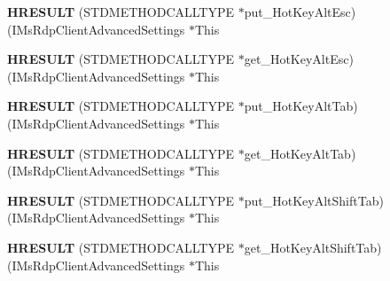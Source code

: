 \begin{DoxyCompactItemize}
\mbox{\label{struct_i_ms_rdp_client_advanced_settings_vtbl_a5c817702ddb5dfebacd35770310aa3d9}} 
{\bfseries H\+R\+E\+S\+U\+LT} (S\+T\+D\+M\+E\+T\+H\+O\+D\+C\+A\+L\+L\+T\+Y\+PE $\ast$put\+\_\+\+Hot\+Key\+Alt\+Esc)(I\+Ms\+Rdp\+Client\+Advanced\+Settings $\ast$This
\item 
\mbox{\label{struct_i_ms_rdp_client_advanced_settings_vtbl_af0b3e5be6158b9b51d9eb143f74f6f72}} 
{\bfseries H\+R\+E\+S\+U\+LT} (S\+T\+D\+M\+E\+T\+H\+O\+D\+C\+A\+L\+L\+T\+Y\+PE $\ast$get\+\_\+\+Hot\+Key\+Alt\+Esc)(I\+Ms\+Rdp\+Client\+Advanced\+Settings $\ast$This
\item 
\mbox{\label{struct_i_ms_rdp_client_advanced_settings_vtbl_a2706046b46534eb54d2806a72e4c41ac}} 
{\bfseries H\+R\+E\+S\+U\+LT} (S\+T\+D\+M\+E\+T\+H\+O\+D\+C\+A\+L\+L\+T\+Y\+PE $\ast$put\+\_\+\+Hot\+Key\+Alt\+Tab)(I\+Ms\+Rdp\+Client\+Advanced\+Settings $\ast$This
\item 
\mbox{\label{struct_i_ms_rdp_client_advanced_settings_vtbl_a32381ae37a025bbe8ef5721672a662ea}} 
{\bfseries H\+R\+E\+S\+U\+LT} (S\+T\+D\+M\+E\+T\+H\+O\+D\+C\+A\+L\+L\+T\+Y\+PE $\ast$get\+\_\+\+Hot\+Key\+Alt\+Tab)(I\+Ms\+Rdp\+Client\+Advanced\+Settings $\ast$This
\item 
\mbox{\label{struct_i_ms_rdp_client_advanced_settings_vtbl_a81fd0c28f1cc4364cc685f11163f8bfe}} 
{\bfseries H\+R\+E\+S\+U\+LT} (S\+T\+D\+M\+E\+T\+H\+O\+D\+C\+A\+L\+L\+T\+Y\+PE $\ast$put\+\_\+\+Hot\+Key\+Alt\+Shift\+Tab)(I\+Ms\+Rdp\+Client\+Advanced\+Settings $\ast$This
\item 
\mbox{\label{struct_i_ms_rdp_client_advanced_settings_vtbl_ac1dff4a88caebffc242d3d24009db1c9}} 
{\bfseries H\+R\+E\+S\+U\+LT} (S\+T\+D\+M\+E\+T\+H\+O\+D\+C\+A\+L\+L\+T\+Y\+PE $\ast$get\+\_\+\+Hot\+Key\+Alt\+Shift\+Tab)(I\+Ms\+Rdp\+Client\+Advanced\+Settings $\ast$This
\item 
\mbox{\label{struct_i_ms_rdp_client_advanced_settings_vtbl_a0849c4c50575b7b7b79145828de9e97b}} 

\end{DoxyCompactItemize}
